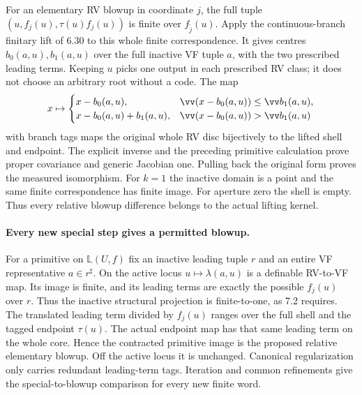 For an elementary RV blowup in coordinate $j$, the full tuple
$(u,f_j(u),\tau(u)f_j(u))$ is finite over $f_{\widetilde j}(u)$.
Apply the continuous-branch finitary lift of 6.30 to this whole finite
correspondence. It gives centres $b_0(a,u),b_1(a,u)$ over the full inactive
VF tuple $a$, with the two prescribed leading terms. Keeping $u$ picks
one output in each prescribed RV class; it does not choose an arbitrary
root without a code. The map
\[
 x\mapsto\begin{cases}
 x-b_0(a,u),&\vv(x-b_0(a,u))\leq\vv b_1(a,u),\\
 x-b_0(a,u)+b_1(a,u),&\vv(x-b_0(a,u))>\vv b_1(a,u)
 \end{cases}
\]
with branch tags maps the original whole RV disc bijectively to the
lifted shell and endpoint. The explicit inverse and the preceding
primitive calculation prove proper covariance and generic Jacobian
one. Pulling back the original form proves the measured isomorphism.
For $k=1$ the inactive domain is a point and the same finite correspondence
has finite image. For aperture zero the shell is empty. Thus every
relative blowup difference belongs to the actual lifting kernel.


\paragraph{Every new special step gives a permitted blowup.}
For a primitive on $\mathbb L(U,f)$ fix an inactive leading tuple $r$
and an entire VF representative $a\in r^\sharp$. On the active locus
$u\mapsto\lambda(a,u)$ is a definable RV-to-VF map. Its image is finite,
and its leading terms are exactly the possible $f_j(u)$ over $r$.
Thus the inactive structural projection is finite-to-one, as 7.2
requires. The translated leading term divided by $f_j(u)$ ranges over
the full shell and the tagged endpoint $\tau(u)$. The actual endpoint
map has that same leading term on the whole core. Hence the contracted
primitive image is the proposed relative elementary blowup. Off the
active locus it is unchanged. Canonical regularization only carries
redundant leading-term tags. Iteration and common refinements give the
special-to-blowup comparison for every new finite word.

